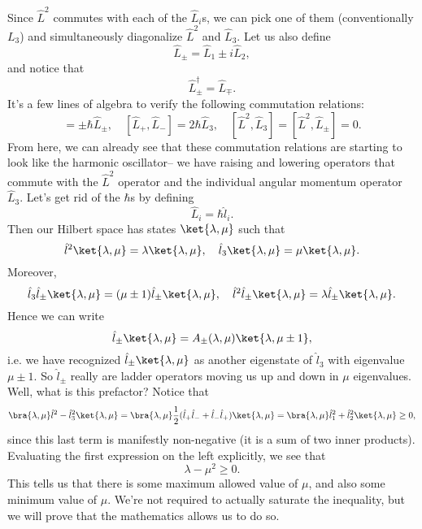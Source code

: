Since $\hat L^2$ commutes with each of the $\hat L_i$s, we can pick one of them (conventionally $L_3$) and simultaneously diagonalize $\hat L^2$ and $\hat L_3$. Let us also define
\begin{equation}
    \hat L_\pm = \hat L_1 \pm i\hat L_2,
\end{equation}
and notice that
\begin{equation}
    \hat L_\pm^\dagger = \hat L_\mp.
\end{equation}
It's a few lines of algebra to verify the following commutation relations:
\begin{equation}
    [\hat L_3, \hat L_\pm] = \pm \hbar \hat L_\pm, \quad [\hat L_+,\hat L_-] = 2\hbar \hat L_3, \quad [\hat L^2, \hat L_3]=[\hat L^2, \hat L_\pm] =0.
\end{equation}
From here, we can already see that these commutation relations are starting to look like the harmonic oscillator-- we have raising and lowering operators that commute with the $\hat L^2$ operator and the individual angular momentum operator $\hat L_3$.
Let's get rid of the $\hbar$s by defining
\begin{equation}
    \hat L_i = \hbar \hat l_i.
\end{equation}
Then our Hilbert space has states $\ket{\lambda,\mu}$ such that
\begin{equation}
    \hat l^2\ket{\lambda,\mu} = \lambda \ket{\lambda,\mu},\quad \hat l_3 \ket{\lambda,\mu} = \mu \ket{\lambda,\mu}.
\end{equation}
Moreover,
\begin{equation}
    \hat l_3 \hat l_\pm \ket{\lambda,\mu} = (\mu\pm 1) \hat l_\pm \ket{\lambda,\mu},\quad \hat l^2 \hat l_\pm \ket{\lambda,\mu} = \lambda \hat l_\pm \ket{\lambda,\mu}.
\end{equation}
Hence we can write
\begin{equation}
    \hat l_\pm \ket{\lambda,\mu} = A_\pm (\lambda,\mu) \ket{\lambda,\mu \pm 1},
\end{equation}
i.e. we have recognized $\hat l_\pm \ket{\lambda,\mu}$ as another eigenstate of $\hat l_3$ with eigenvalue $\mu \pm 1$. So $\hat l_\pm$ really are ladder operators moving us up and down in $\mu$ eigenvalues. Well, what is this prefactor? Notice that
\begin{equation}
    \bra{\lambda,\mu} \hat l^2 - \hat l_3^2 \ket{\lambda,\mu} = \bra{\lambda,\mu} \frac{1}{2} (\hat l_+ \hat l_- + \hat l_- \hat l_+) \ket{\lambda,\mu} = \bra{\lambda,\mu} \hat l_1^2 + \hat l_2^2 \ket{\lambda,\mu} \geq 0,
\end{equation}
since this last term is manifestly non-negative (it is a sum of two inner products). Evaluating the first expression on the left explicitly, we see that
\begin{equation}
    \lambda-\mu^2 \geq 0.
\end{equation}
This tells us that there is some maximum allowed value of $\mu$, and also some minimum value of $\mu$. We're not required to actually saturate the inequality, but we will prove that the mathematics allows us to do so.

